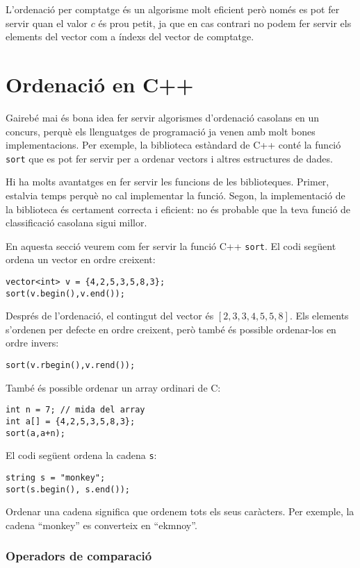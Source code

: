 L'ordenació per comptatge és un algorisme molt eficient
però només es pot fer servir quan el valor $c$
és prou petit, ja que en cas contrari no podem fer servir els
elements del vector com a índexs del vector de comptatge.

\section{Ordenació en C++}


Gairebé mai és bona idea fer servir
algorismes d'ordenació casolans
en un concurs, perquè els llenguatges de programació
ja venen amb molt bones implementacions.
Per exemple, la biblioteca estàndard de C++ conté
la funció \texttt{sort} que es pot fer servir per a ordenar
vectors i altres estructures de dades.

Hi ha molts avantatges en fer servir les funcions de les biblioteques.
Primer, estalvia temps perquè no cal implementar la funció.
Segon, la implementació de la biblioteca és
certament correcta i eficient: no és probable
que la teva funció de classificació casolana sigui millor.

En aquesta secció veurem com fer servir la
funció C++ \texttt{sort}.
El codi següent ordena
un vector en ordre creixent:
\begin{lstlisting}
vector<int> v = {4,2,5,3,5,8,3};
sort(v.begin(),v.end());
\end{lstlisting}
Després de l'ordenació, el contingut del
vector és
$[2,3,3,4,5,5,8]$.
Els elements s'ordenen per defecte en ordre creixent,
però també és possible ordenar-los en ordre invers:
\begin{lstlisting}
sort(v.rbegin(),v.rend());
\end{lstlisting}
També és possible ordenar un array ordinari de C:
\begin{lstlisting}
int n = 7; // mida del array
int a[] = {4,2,5,3,5,8,3};
sort(a,a+n);
\end{lstlisting}

El codi següent ordena la cadena \texttt{s}:
\begin{lstlisting}
string s = "monkey";
sort(s.begin(), s.end());
\end{lstlisting}
Ordenar una cadena significa que ordenem tots
els seus caràcters.
Per exemple, la cadena ``monkey'' es converteix en ``ekmnoy''.

\subsubsection{Operadors de comparació}

